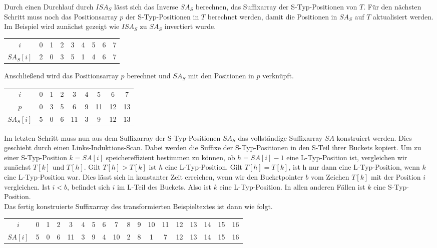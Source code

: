 Durch einen Durchlauf durch $ISA_S$ lässt sich das Inverse $SA_S$ berechnen, das Suffixarray der S-Typ-Positionen von $T$. Für den nächsten Schritt muss noch das Positionsarray $p$ der S-Typ-Positionen in $T$ berechnet werden, damit die Positionen in $SA_S$ auf $T$ aktualisiert werden. \\
Im Beispiel wird zunächst gezeigt wie $ISA_S$ zu $SA_S$ invertiert wurde.

\begin{table}[H]
	\centering
	\begin{tabular}{c| c c c c c c c c }
		$i$ & 0 & 1 & 2 & 3 & 4 & 5 & 6 & 7\\
		$SA_S[i]$ & 2 & 0 & 3 & 5 & 1 & 4 & 6 & 7 
	\end{tabular}
\end{table}

Anschließend wird das Positionsarray $p$ berechnet und $SA_S$ mit den Positionen in $p$ verknüpft. 

\begin{table}[H]
	\centering
	\begin{tabular}{c| c c c c c c c c }
		$i$ & 0 & 1 & 2 & 3 & 4 & 5 & 6 & 7\\
		$p$ & 0 & 3 & 5 & 6 & 9 & 11 & 12 & 13\\
		$SA_S[i]$ & 5 & 0 & 6 & 11 & 3 & 9 & 12 & 13 
	\end{tabular}
\end{table}

Im letzten Schritt muss nun aus dem Suffixarray der S-Typ-Positionen $SA_S$ das vollständige Suffixarray $SA$ konstruiert werden. Dies geschieht durch einen Links-Induktions-Scan. Dabei werden die Suffixe der S-Typ-Positionen in den S-Teil ihrer Buckets kopiert. Um zu einer S-Typ-Position $k=SA[i]$ speichereffizient bestimmen zu können, ob $h=SA[i]-1$ eine L-Typ-Position ist, vergleichen wir zunächst $T[k]$ und $T[h]$. Gilt $T[h] > T[k]$ ist $h$ eine L-Typ-Position. Gilt $T[h] = T[k]$, ist h nur dann eine L-Typ-Position, wenn $k$ eine L-Typ-Position war. Dies lässt sich in konstanter Zeit erreichen, wenn wir den Bucketpointer $b$ vom Zeichen $T[k]$ mit der Position $i$ vergleichen. Ist $i < b$, befindet sich $i$ im L-Teil des Buckets. Also ist $k$ eine L-Typ-Position. In allen anderen Fällen ist $k$ eine S-Typ-Position. \\
Das fertig konstruierte Suffixarray des transformierten Beispieltextes ist dann wie folgt. 

\begin{table}[H]
	\centering
	\begin{tabular}{c| c c c c c c c c c c c c c c c c c}
		$i$ & 0 & 1 & 2 & 3 & 4 & 5 & 6 & 7 & 8 & 9 & 10 & 11 & 12 & 13 & 14 & 15 & 16 \\
		$SA[i]$ & 5 & 0 & 6 & 11 & 3 & 9 & 4 & 10 & 2 & 8 & 1 & 7 & 12 & 13 & 14 & 15 & 16 
	\end{tabular}
\end{table}

